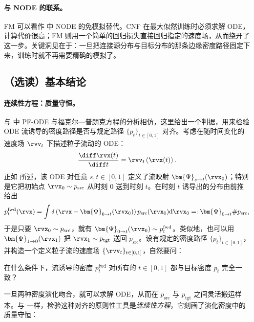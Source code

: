\paragraph{与 NODE 的联系。}
FM 可以看作  中 NODE 的免模拟替代。CNF 在最大似然训练时必须求解 ODE，计算代价很高；FM 则用一个简单的回归损失直接回归指定的速度场，从而绕开了这一步。关键洞见在于：一旦把连接源分布与目标分布的那条边缘密度路径固定下来，训练时就不再需要精确的模拟了。


\subsection{（选读）基本结论}\label{subsec:fm-theory}

\paragraph{连续性方程：质量守恒。}
与  中 PF-ODE 与福克尔—普朗克方程的分析相仿，这里给出一个判据，用来检验 ODE 流诱导的密度路径是否与规定路径 $\{p_t\}_{t \in [0,1]}$ 对齐。考虑在随时间变化的速度场 $\rvv_t$ 下描述粒子流动的 ODE：
\[
\frac{\diff \rvx(t)}{\diff t} = \rvv_t\left(\rvx(t)\right).
\]
正如  所述，该 ODE 对任意 $s,t \in [0,1]$ 定义了流映射 $\bm{\Psi}_{s\to t}(\rvx_0)$；特别是它把初始点 $\rvx_0 \sim p_{\mathrm{src}}$ 从时刻 $0$ 送到时刻 $t$。在时刻 $t$ 诱导出的分布由前推给出
\begin{align}\label{eq:ode-pushforward}
    p_t^{\mathrm{fwd}}(\rvx)
    = \int \delta \left(\rvx - \bm{\Psi}_{0\to t}(\rvx_0)\right)
      p_{\mathrm{src}}(\rvx_0) \mathrm{d}\rvx_0=: \bm{\Psi}_{0\to t}\# p_{\mathrm{src}},
\end{align}
于是只要 $\rvx_0 \sim p_{\mathrm{src}}$，就有 $\bm{\Psi}_{0\to t}(\rvx_0) \sim p_t^{\mathrm{fwd}}$。类似地，也可以用 $\bm{\Psi}_{1\to 0}(\rvx_1)$ 把 $\rvx_1 \sim p_{\mathrm{tgt}}$ 送回 $p_{\mathrm{src}}$。设有规定的密度路径 $\{p_t\}_{t \in [0,1]}$，并构造一个定义粒子流的速度场 $\{\rvv_t\}_{t \in [0,1]}$，自然要问：

\begin{question}
    在什么条件下，流诱导的密度 $p_t^{\mathrm{fwd}}$ 对所有的 $t \in [0,1]$ 都与目标密度 $p_t$ 完全一致？
\end{question}
一旦两种密度演化吻合，就可以求解 ODE，从而在 $p_{\mathrm{src}}$ 与 $p_{\mathrm{tgt}}$ 之间灵活搬运样本。与  一样，检验这种对齐的原则性工具是\emph{连续性方程}，它刻画了演化密度中的质量守恒：



